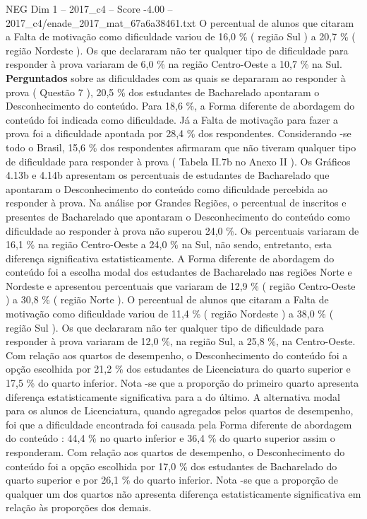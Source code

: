 \begin{textsample}{NEG Dim 1 – 2017\_c4 – Score -4.00 – 2017\_c4/enade\_2017\_mat\_67a6a38461.txt}
O percentual de alunos que citaram a Falta de motivação como dificuldade variou de 16,0 \% ( região Sul ) a 20,7 \% ( região Nordeste ).
Os que declararam não ter qualquer tipo de dificuldade para responder à prova variaram de 6,0 \% na região Centro-Oeste a 10,7 \% na Sul. \textbf{Perguntados} sobre as dificuldades com as quais se depararam ao responder à prova ( Questão 7 ), 20,5 \% dos estudantes de Bacharelado apontaram o Desconhecimento do conteúdo.
Para 18,6 \%, a Forma diferente de abordagem do conteúdo foi indicada como dificuldade.
Já a Falta de motivação para fazer a prova foi a dificuldade apontada por 28,4 \% dos respondentes.
Considerando -se todo o Brasil, 15,6 \% dos respondentes afirmaram que não tiveram qualquer tipo de dificuldade para responder à prova ( Tabela II.7b no Anexo II ).
Os Gráficos 4.13b e 4.14b apresentam os percentuais de estudantes de Bacharelado que apontaram o Desconhecimento do conteúdo como dificuldade percebida ao responder à prova.
Na análise por Grandes Regiões, o percentual de inscritos e presentes de Bacharelado que apontaram o Desconhecimento do conteúdo como dificuldade ao responder à prova não superou 24,0 \%.
Os percentuais variaram de 16,1 \% na região Centro-Oeste a 24,0 \% na Sul, não sendo, entretanto, esta diferença significativa estatisticamente.
A Forma diferente de abordagem do conteúdo foi a escolha modal dos estudantes de Bacharelado nas regiões Norte e Nordeste e apresentou percentuais que variaram de 12,9 \% ( região Centro-Oeste ) a 30,8 \% ( região Norte ).
O percentual de alunos que citaram a Falta de motivação como dificuldade variou de 11,4 \% ( região Nordeste ) a 38,0 \% ( região Sul ).
Os que declararam não ter qualquer tipo de dificuldade para responder à prova variaram de 12,0 \%, na região Sul, a 25,8 \%, na Centro-Oeste.
Com relação aos quartos de desempenho, o Desconhecimento do conteúdo foi a opção escolhida por 21,2 \% dos estudantes de Licenciatura do quarto superior e 17,5 \% do quarto inferior.
Nota -se que a proporção do primeiro quarto apresenta diferença estatisticamente significativa para a do último.
A alternativa modal para os alunos de Licenciatura, quando agregados pelos quartos de desempenho, foi que a dificuldade encontrada foi causada pela Forma diferente de abordagem do conteúdo : 44,4 \% no quarto inferior e 36,4 \% do quarto superior assim o responderam.
Com relação aos quartos de desempenho, o Desconhecimento do conteúdo foi a opção escolhida por 17,0 \% dos estudantes de Bacharelado do quarto superior e por 26,1 \% do quarto inferior.
Nota -se que a proporção de qualquer um dos quartos não apresenta diferença estatisticamente significativa em relação às proporções dos demais.

\end{textsample}
